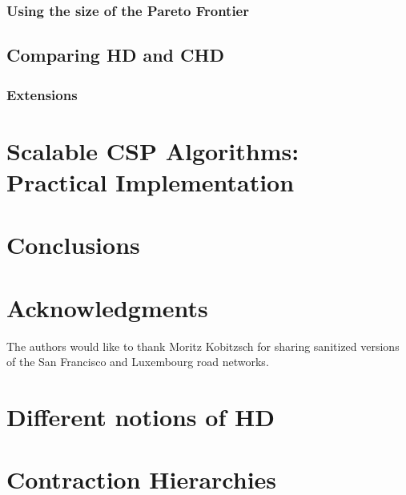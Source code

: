 \documentclass{vldb}
\begin{document}
\subsubsection{Using the size of the Pareto Frontier}


\subsection{Comparing HD and CHD}
\label{ssec:hdvschd}


\subsubsection{Extensions}


\section{Scalable CSP Algorithms:\\ Practical Implementation}


\section{Conclusions}


\balance

\section{Acknowledgments}

The authors would like to thank Moritz Kobitzsch for sharing sanitized versions of the San Francisco and Luxembourg road networks.


 


\begin{appendix}

\section{Different notions of HD}
\label{app:generalhd}


\section{Contraction Hierarchies}


\end{appendix}
\end{document}

